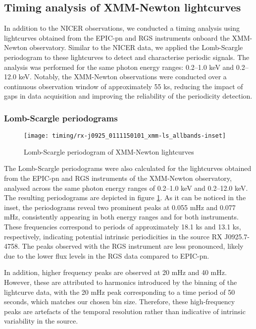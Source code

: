 				
		\subsection{Timing analysis of XMM-Newton lightcurves}
			In addition to the NICER observations, we conducted a timing analysis using lightcurves obtained from the EPIC-pn and RGS instruments onboard the XMM-Newton observatory. Similar to the NICER data, we applied the Lomb-Scargle periodogram to these lightcurves to detect and characterise periodic signals. The analysis was performed for the same photon energy ranges: 0.2--1.0 keV and 0.2--12.0 keV. Notably, the XMM-Newton observations were conducted over a continuous observation window of approximately 55 ks, reducing the impact of gaps in data acquisition and improving the reliability of the periodicity detection.
			
			\subsubsection{Lomb-Scargle periodograms}
				\begin{figure}[h!]
					\centering
					\texttt{[image: timing/rx-j0925\_0111150101\_xmm-ls\_allbands-inset]}
					\caption{Lomb-Scargle periodogram of XMM-Newton lightcurves}
					\label{result:ls-mrvel-xmm}
				\end{figure}
				The Lomb-Scargle periodograms were also calculated for the lightcurves obtained from the EPIC-pn and RGS instruments of the XMM-Newton observatory, analysed across the same photon energy ranges of 0.2--1.0 keV and 0.2--12.0 keV. The resulting periodograms are depicted in figure \ref{result:ls-mrvel-xmm}. As it can be noticed in the inset, the periodograms reveal two prominent peaks at 0.055 mHz and 0.077 mHz, consistently appearing in both energy ranges and for both instruments. These frequencies correspond to periods of approximately 18.1 ks and 13.1 ks, respectively, indicating potential intrinsic periodicities in the source RX J0925.7-4758. The peaks observed with the RGS instrument are less pronounced, likely due to the lower flux levels in the RGS data compared to EPIC-pn.
				
				In addition, higher frequency peaks are observed at 20 mHz and 40 mHz. However, these are attributed to harmonics introduced by the binning of the lightcurve data, with the 20 mHz peak corresponding to a time period of 50 seconds, which matches our chosen bin size. Therefore, these high-frequency peaks are artefacts of the temporal resolution rather than indicative of intrinsic variability in the source.
			
